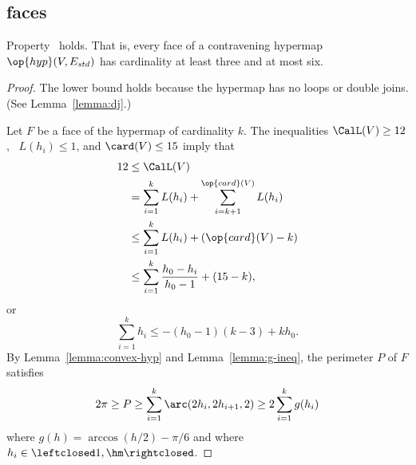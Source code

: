 %

\subsection{faces}



\begin{lemma}[]  \label{lemma:face-size}
  Property~ holds.  That is, every face of a
  contravening hypermap $\op{hyp}(V,E_{std})$ has cardinality at least
  three and at most six.
\end{lemma}

\begin{proof} The lower bound holds because the hypermap has no loops
  or double joins.  (See Lemma~\ref{lemma:dj}.)  

Let $F$ be a face of the
  hypermap of cardinality $k$.  The inequalities $\CalL(V)\ge 12$,
 ~$L(h_i)\le1$, and $\card(V)\le 15$ 
imply that
\begin{align*}
12 &\le \CalL(V) \\
   &= \sum_{i=1}^k L(h_i) + \sum_{i={k+1}}^{\op{card}(V)} L(h_i) \\
   &\le \sum_{i=1}^k L(h_i) + (\op{card}(V)-k)\\
   &\le \sum_{i=1}^k \dfrac{h_0-h_i}{h_0-1} + (15-k),
\end{align*}
or
\[
\sum_{i=1}^k h_i \le -(h_0-1) (k-3) + k h_0.
\]
By Lemma~\ref{lemma:convex-hyp} and Lemma~\ref{lemma:g-ineq},
the perimeter $P$ of $F$ satisfies
\[
2\pi\ge P\ge
\sum_{i=1}^k \arc(2h_i,2h_{i+1},2)\ge 2\sum_{i=1}^k g(h_i)
\]
where $g(h) = \arccos(h/2)-\pi/6$ and
where $h_i\in \leftclosed 1,\hm\rightclosed$.


\end{proof}
